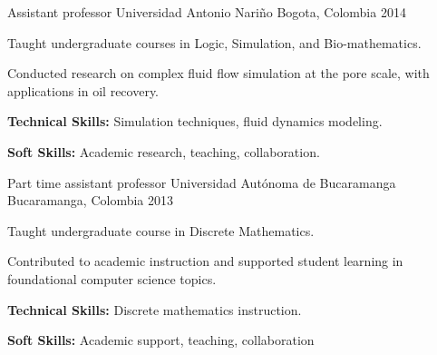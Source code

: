 \begin{cventries}
   \cventry
      {Assistant professor} %
      {Universidad Antonio Nariño} %
      {Bogota, Colombia} %
      {2014} %
      {
        \begin{cvitems} %
          \item {Taught undergraduate courses in Logic, Simulation, and Bio-mathematics.}
          \item {Conducted research on complex fluid flow simulation at the pore scale, with applications in oil recovery.}
          \item {\textbf{Technical Skills:} Simulation techniques, fluid dynamics modeling.}
          \item {\textbf{Soft Skills:} Academic research, teaching, collaboration.}
        \end{cvitems}
      }

   \cventry
      {Part time assistant professor} %
      {Universidad Autónoma de Bucaramanga} %
      {Bucaramanga, Colombia} %
      {2013} %
      {
        \begin{cvitems} %
          \item {Taught undergraduate course in Discrete Mathematics.}
          \item {Contributed to academic instruction and supported student learning in foundational computer science topics.}
          \item {\textbf{Technical Skills:} Discrete mathematics instruction.}
          \item {\textbf{Soft Skills:} Academic support, teaching, collaboration}
        \end{cvitems}
      }


\end{cventries}
